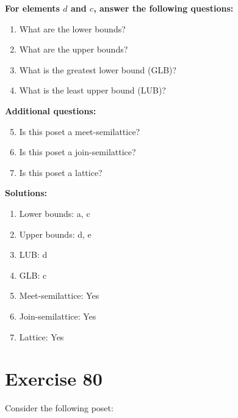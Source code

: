 \documentclass{article}
\begin{document}
    \textbf{For elements $d$ and $c$, answer the following questions:}
\begin{enumerate}
    \item What are the lower bounds?
    \item What are the upper bounds?
    \item What is the greatest lower bound (GLB)?
    \item What is the least upper bound (LUB)?
\end{enumerate}
    \hspace*{3ex} \textbf{Additional questions:}
\begin{enumerate}
    \setcounter{enumi}{4}
    \item Is this poset a meet-semilattice?
    \item Is this poset a join-semilattice?
    \item Is this poset a lattice?
\end{enumerate}

\textbf{Solutions:}
\begin{enumerate}
    \item Lower bounds: {a, c}
    \item Upper bounds: {d, e}
    \item LUB: d
    \item GLB: c
    \item Meet-semilattice: Yes
    \item Join-semilattice: Yes
    \item Lattice: Yes
\end{enumerate}
\newpage
\section*{Exercise 80}
Consider the following poset:
\begin{center}
\end{center}
\end{document}

